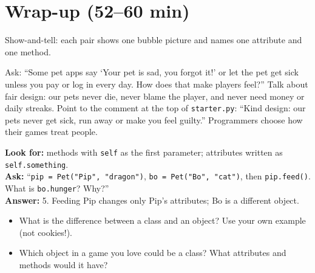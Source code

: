 \section{Wrap-up (52--60 min)}
Show-and-tell: each pair shows one bubble picture and names one attribute and one method.

\begin{safety}
Ask: \enquote{Some pet apps say \enquote{Your pet is sad, you forgot it!} or let the pet get sick unless you pay or log in every day. How does that make players feel?} Talk about fair design: our pets never die, never blame the player, and never need money or daily streaks. Point to the comment at the top of \texttt{starter.py}: \enquote{Kind design: our pets never get sick, run away or make you feel guilty.} Programmers choose how their games treat people.
\end{safety}

\begin{formativecheck}
\textbf{Look for:} methods with \texttt{self} as the first parameter; attributes written as \texttt{self.something}.\\
\textbf{Ask:} \enquote{\texttt{pip = Pet("Pip", "dragon")}, \texttt{bo = Pet("Bo", "cat")}, then \texttt{pip.feed()}. What is \texttt{bo.hunger}? Why?}\\
\textbf{Answer:} 5. Feeding Pip changes only Pip's attributes; Bo is a different object.
\end{formativecheck}

\begin{reflection}
\begin{itemize}[itemsep=1pt]
  \item What is the difference between a class and an object? Use your own example (not cookies!).
  \item Which object in a game you love could be a class? What attributes and methods would it have?
\end{itemize}
\end{reflection}

